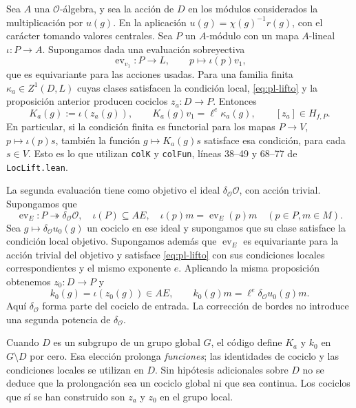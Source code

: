 Sea $A$ una $\mathcal O$-álgebra, y sea la acción de $D$ en los
módulos considerados la multiplicación por $u(g)$. En la aplicación
$u(g)=\chi(g)^{-1}r(g)$, con el carácter tomando valores centrales.
Sea $P$ un $A$-módulo con un mapa $A$-lineal
$\iota:P\to A$. Supongamos dada una evaluación sobreyectiva
\[
 \operatorname{ev}_{v_1}:P\longrightarrow L,
 \qquad p\longmapsto\iota(p)v_1,
\]
que es equivariante para las acciones usadas. Para una familia finita
$\kappa_a\in Z^1(D,L)$ cuyas clases satisfacen la condición local,
\eqref{eq:pl-lifto} y la proposición anterior producen cociclos
$z_a:D\to P$. Entonces
\begin{equation}
 K_a(g):=\iota(z_a(g)),\qquad
 K_a(g)v_1=\ell^e\kappa_a(g),\qquad [z_a]\in H_{f,P}.
 \label{eq:pl-colk}
\end{equation}
En particular, si la condición finita es functorial para los mapas
$P\to V$, $p\mapsto\iota(p)s$, también la función
$g\mapsto K_a(g)s$ satisface esa condición, para cada $s\in V$.
Esto es lo que utilizan \texttt{colK} y \texttt{colFun}, líneas
38--49 y 68--77 de \texttt{LocLift.lean}.

La segunda evaluación tiene como objetivo el ideal
$\delta_{\mathcal O}\mathcal O$, con acción trivial. Supongamos que
\[
 \operatorname{ev}_E:P\twoheadrightarrow\delta_{\mathcal O}\mathcal O,
 \quad \iota(P)\subseteq AE,
 \quad \iota(p)m=\operatorname{ev}_E(p)m\quad(p\in P,m\in M).
\]
Sea $g\mapsto\delta_{\mathcal O}u_0(g)$ un cociclo en ese ideal y
supongamos que su clase satisface la condición local objetivo.
Supongamos además que $\operatorname{ev}_E$ es equivariante para
la acción trivial del objetivo y satisface \eqref{eq:pl-lifto}
con sus condiciones locales correspondientes y el mismo exponente $e$.
Aplicando la misma proposición obtenemos $z_0:D\to P$ y
\begin{equation}
 k_0(g)=\iota(z_0(g))\in AE,\qquad
 k_0(g)m=\ell^e\delta_{\mathcal O}u_0(g)m.
 \label{eq:pl-col-e}
\end{equation}
Aquí $\delta_{\mathcal O}$ forma parte del cociclo de entrada. La
corrección de bordes no introduce una segunda potencia de
$\delta_{\mathcal O}$.

Cuando $D$ es un subgrupo de un grupo global $G$, el código define
$K_a$ y $k_0$ en $G\setminus D$ por cero. Esa elección prolonga
\emph{funciones}; las identidades de cociclo y las condiciones
locales se utilizan en $D$. Sin hipótesis adicionales sobre $D$ no
se deduce que la prolongación sea un cociclo global ni que sea
continua. Los cociclos que sí se han construido son $z_a$ y $z_0$
en el grupo local.

